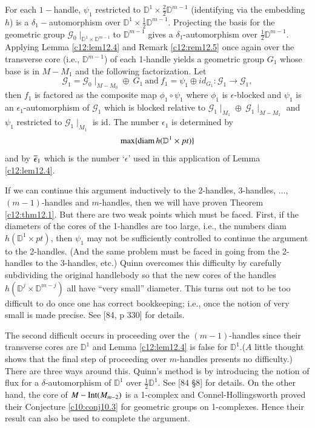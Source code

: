For each $1-$handle, $\psi_1$ restricted to $\mathbb{D}^1 \times
\frac{2}{2} \mathbb{D}^{m-1}$ (identifying via the embedding $h$) is a
$\delta_1-$automorphism over $\mathbb{D}^1 \times \frac{1}{2}
\mathbb{D}^{m-1}$. Projecting the basis for the geometric group
$\mathcal{G}_0 \mid_{\mathbb{D}^1 \times
  \mathbb{D}^{m-1}}$\pageoriginale to $\mathbb{D}^{m-1}$ gives a
$\delta_1$-automorphism over $\frac{1}{2} \mathbb{D}^{m-1}$. Applying
Lemma \ref{c12:lem12.4} and Remark \ref{c12:rem12.5} once again over
the transverse core (i.e., $\mathbb{D}^{m-1}$) of each 1-handle yields
a geometric group $G_1$ whose base is in $M - M_1$ and the following
factorization. Let
$$
\mathcal{G}_1 = \mathcal{G}_0\mid_{M- M_0} \oplus ~G_1 ~\text{and}~
f_1 = \psi_1 \oplus id_{G_1}: \mathcal{G}_1 \to \mathcal{G}_1,
$$
then $f_1$ is factored as the composite map $\phi_1 \circ \psi_1$
where $\phi_1$ is $\epsilon$-blocked and $\psi_1$ is an
$\epsilon_1$-automorphism of $\mathcal{G}_1$ which is blocked relative
to $\mathcal{G}_1 \mid_{M_1} \oplus ~\mathcal{G}_1 \mid_{M- M_1}$ and
$\psi_1$ restricted to $\mathcal{G}_1 \mid_{M_1}$ is id. The number
$\epsilon_1$ is determined by 
$$
\max \{ \operatorname{diam} h(\mathbb{D}^1 \times pt)\}
$$
and by $\overline{\epsilon}_1$ which is the number `$\epsilon$' used in this
application of Lemma \ref{c12:lem12.4}.

If we can continue this argument inductively to the 2-handles,
3-handles, $\ldots$, $(m-1)$-handles and $m$-handles, then we will
have proven Theorem \ref{c12:thm12.1}. But there are two weak points
which must be faced. First, if the diameters of the cores of the
1-handles are too large, i.e., the numbers diam $h(\mathbb{D}^1 \times
pt)$, then $\psi_1$ may not be sufficiently controlled to continue the
argument to the 2-handles. (And the same problem must be faced in
going from the 2-handles to the 3-handles, etc.) Quinn overcomes this
difficulty by carefully subdividing the original handlebody so that
the new cores of the handles $h (\mathbb{D}^j \times
\mathbb{D}^{m-j})$ all have ``very small'' diameter. This turns out
not to be too difficult to do once one has correct bookkeeping; i.e.,
once the notion of very small is made precise. See [84, p 330] for details.

The second difficult occurs in proceeding over the $(m-1)$-handles
since their transverse cores are $\mathbb{D}^1$ and Lemma
\ref{c12:lem12.4} is false for $\mathbb{D}^1$.\break ($A$ little thought
shows that the final step of proceeding over $m$-handles presents no
difficulty.) There are three ways around this. Quinn's meth\-od is by
introducing the notion of flux for a $\delta$-automorphism of
$\mathbb{D}^1$ over $\frac{1}{2} \mathbb{D}^1$. See [84 \S 8] for
details. On the other hand, the core of $M-\operatorname{Int}(M_{m-2})$ is a
1-complex and Connel-Hollingsworth \cite{20} proved their Conjecture
\ref{c10:conj10.3} for geometric groups on 1-complexes. Hence their
result can also be used to complete the argument.

